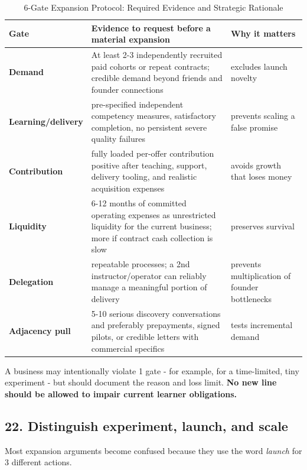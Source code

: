 \begin{table}[t]
\centering
\small
\caption{6-Gate Expansion Protocol: Required Evidence and Strategic Rationale}
\label{tab:ch36_expansion_gates}
\begin{tabularx}{\textwidth}{p{3.0cm} p{7.0cm} X}
\toprule
\textbf{ Gate } & \textbf{ Evidence to request before a material expansion } & \textbf{ Why it matters } \\
\midrule
 \textbf{Demand}  &  At least 2-3 independently recruited paid cohorts or repeat contracts; credible demand beyond friends and founder connections  &  excludes launch novelty  \\
 \textbf{Learning/\allowbreak delivery}  &  pre-specified independent competency measures, satisfactory completion, no persistent severe quality failures  &  prevents scaling a false promise  \\
 \textbf{Contribution}  &  fully loaded per-offer contribution positive after teaching, support, delivery tooling, and realistic acquisition expenses  &  avoids growth that loses money  \\
 \textbf{Liquidity}  &  6-12 months of committed operating expenses as unrestricted liquidity for the current business; more if contract cash collection is slow  &  preserves survival  \\
 \textbf{Delegation}  &  repeatable processes; a 2nd instructor/\allowbreak operator can reliably manage a meaningful portion of delivery  &  prevents multiplication of founder bottlenecks  \\
 \textbf{Adjacency pull}  &  5-10 serious discovery conversations and preferably prepayments, signed pilots, or credible letters with commercial specifics  &  tests incremental demand  \\
\bottomrule
\end{tabularx}
\end{table}

A business may intentionally violate 1 gate - for example, for a time-limited, tiny experiment - but should document the reason and loss limit. \textbf{No new line should be allowed to impair current learner obligations.}

\subsection{22. Distinguish experiment, launch, and scale}

Most expansion arguments become confused because they use the word \textit{launch} for 3 different actions.

